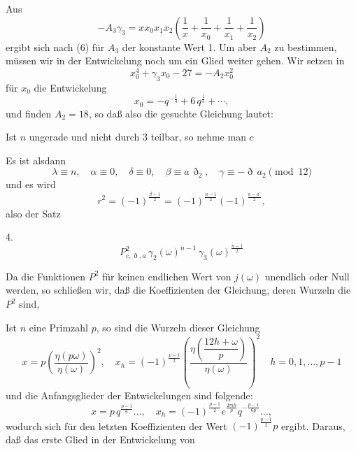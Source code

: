Aus
\[
-A_3\gamma_3 = x x_0 x_1 x_2\left(\frac{1}{x}+\frac{1}{x_0}+\frac{1}{x_1}+\frac{1}{x_2}\right)
\]
ergibt sich nach (6) für $A_3$ der konstante Wert 1. Um aber $A_2$
zu bestimmen, müssen wir in der Entwickelung noch um ein Glied
weiter gehen. Wir setzen in
\[
x_0^4 + \gamma_3 x_0 - 27 = -A_2 x_0^2
\]
für $x_0$ die Entwickelung
\[
x_0 = -q^{-\frac{1}{3}} + 6\,q^{\frac{1}{3}} + \cdots,
\]
und finden $A_2 = 18$, so daß also die gesuchte Gleichung lautet:

Ist $n$ ungerade und nicht durch 3 teilbar, so nehme man $c$ 

Es ist alsdann
\[
\lambda \equiv n, \quad \alpha \equiv 0, \quad \delta \equiv 0, \quad
\beta \equiv a\,\eth_2, \quad \gamma \equiv -\eth\,a_2 \pmod{12}
\]
und es wird
\[
r^2 = (-1)^{\frac{\beta-1}{2}} = (-1)^{\frac{n-1}{2}}(-1)^{\frac{a-a'}{2}}, %
\]
also der Satz

4. 
\[
P^{2}_{c,\eth,a}\,\gamma_2(\omega)^{n-1}\,\gamma_3(\omega)^{\frac{n-1}{2}}
\]

Da die Funktionen $P^2$ für keinen endlichen Wert von $j(\omega)$
unendlich oder Null werden, so schließen wir, daß die Koeffizienten
der Gleichung, deren Wurzeln die $P^2$ sind, 

Ist $n$ eine Primzahl $p$, so sind die Wurzeln dieser Gleichung
\[
x = p\left(\frac{\eta(p\omega)}{\eta(\omega)}\right)^2, \quad
x_h = (-1)^{\frac{p-1}{2}}\left(\frac{\eta\left(\dfrac{12h+\omega}{p}\right)}{\eta(\omega)}\right)^2
\quad h=0,1,\dots,p-1
\]
und die Anfangsglieder der Entwickelungen sind folgende:
\[
x = p\,q^{\frac{p-1}{6}}\dots, \quad
x_h = (-1)^{\frac{p-1}{2}}e^{\frac{2\pi i h}{p}}q^{-\frac{p-1}{6p}}\dots,
\]
wodurch sich für den letzten Koeffizienten der Wert $(-1)^{\frac{p-1}{2}}p$
ergibt. Daraus, daß das erste Glied in der Entwickelung von
